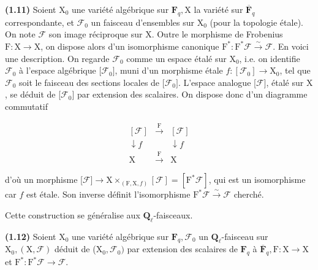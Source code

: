\documentclass[10pt,leqno]{article}
\begin{document}
\noindent \textbf{(1.11)} Soient \(\mathrm{X}_{0}\) une variété algébrique sur \(\mathbf{F}_{q}, \mathrm{X}\) la variété sur \(\overline{\mathbf{F}}_{q}\) correspondante, et \(\mathcal{F} _{0}\) un faisceau d’ensembles sur \(\mathrm{X}_{0}\) (pour la topologie étale). On note \(\mathcal{F} \) son image réciproque sur \(\mathrm{X}\). Outre le morphisme de Frobenius \(\mathrm{F} : \mathrm{X}\longrightarrow \mathrm{X}\), on dispose alors d’un isomorphisme canonique \(\mathrm{F}^{*} : \mathrm{F}^{*}\mathcal{F}  \xrightarrow{\sim } \mathcal{F} \). En voici une description. On regarde \(\mathcal{F} _{0}\) comme un espace étalé sur \(\mathrm{X}_{0}\), i.e. on identifie \(\mathcal{F} _{0}\) à l’espace algébrique [\(\mathcal{F} _{0}]\), muni d’un morphisme étale \(f : [\mathcal{F} _{0}]\longrightarrow \mathrm{X}_{0}\), tel que \(\mathcal{F} _{0}\) soit le faisceau des sections locales de [\(\mathcal{F} _{0}]\). L’espace analogue [\(\mathcal{F} ]\), étalé sur \(\mathrm{X}\), se déduit de [\(\mathcal{F} _{0}]\) par extension des scalaires. On dispose donc d’un diagramme commutatif\par

\[\begin{array}{ccc}[\mathcal F]&\xrightarrow{\mathrm F}&[\mathcal F]\\ \downarrow\!f&&\downarrow\!f\\ \mathrm X&\xrightarrow{\mathrm F}&\mathrm X\end{array}\]

\noindent d’où un morphisme [\(\mathcal{F} ]\longrightarrow \mathrm{X}\times _{(\mathrm{F},\mathrm{X},f)}[\mathcal{F} ]=[\mathrm{F}^{*}\mathcal{F} ]\), qui est un isomorphisme car \(f\) est étale. Son inverse définit l’isomorphisme \(\mathrm{F}^{*}\mathcal{F}  \xrightarrow{\sim } \mathcal{F} \) cherché.\par

\noindent Cette construction se généralise aux \(\mathbf{Q}_{\ell }\)-faisceaux.\par

\noindent \textbf{(1.12)} Soient \(\mathrm{X}_{0}\) une variété algébrique sur \(\mathbf{F}_{q}, \mathcal{F} _{0}\) un \(\mathbf{Q}_{\ell }\)-faisceau sur \(\mathrm{X}_{0}, (\mathrm{X},\mathcal{F} )\) déduit de (\(\mathrm{X}_{0},\mathcal{F} _{0})\) par extension des scalaires de \(\mathbf{F}_{q}\) à \(\overline{\mathbf{F}}_{q}, \mathrm{F} : \mathrm{X}\longrightarrow \mathrm{X}\) et \(\mathrm{F}^{*} : \mathrm{F}^{*}\mathcal{F} \longrightarrow \mathcal{F} \).\par
\end{document}
